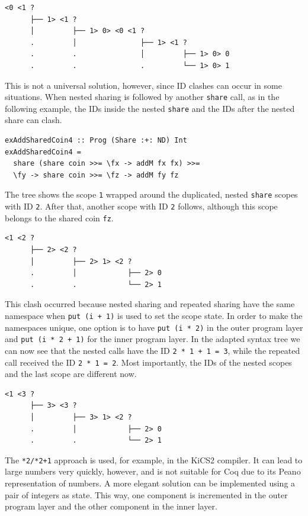 \documentclass[a4paper, 11pt, fleqn, twoside]{scrreprt}
\newcommand{\hinl}[1]{\texttt{#1}}
\begin{document}
\begin{verbatim}
<0 <1 ? 
      ├── 1> <1 ? 
      │         ├── 1> 0> <0 <1 ? 
      .         │               ├── 1> <1 ? 
      .         .               │         ├── 1> 0> 0
      .         .               .         └── 1> 0> 1
\end{verbatim}

This is not a universal solution, however, since ID clashes can occur in some situations.
When nested sharing is followed by another \hinl{share} call, as in the following example, the IDs inside the nested \hinl{share} and the IDs after the nested share can clash.

\begin{verbatim}
exAddSharedCoin4 :: Prog (Share :+: ND) Int
exAddSharedCoin4 =
  share (share coin >>= \fx -> addM fx fx) >>=
  \fy -> share coin >>= \fz -> addM fy fz
\end{verbatim}

The tree shows the scope \hinl{1} wrapped around the duplicated, nested \hinl{share} scopes with ID \hinl{2}.
After that, another scope with ID \hinl{2} follows, although this scope belongs to the shared coin \hinl{fz}.

\begin{verbatim}
<1 <2 ? 
      ├── 2> <2 ? 
      │         ├── 2> 1> <2 ?
      .         │            ├── 2> 0
      .         .            └── 2> 1
\end{verbatim}

This clash occurred because nested sharing and repeated sharing have the same namespace when \hinl{put (i + 1)} is used to set the scope state.
In order to make the namespaces unique, one option is to have \hinl{put (i * 2)} in the outer program layer and \hinl{put (i * 2 + 1)} for the inner program layer.
In the adapted syntax tree we can now see that the nested calls have the ID \hinl{2 * 1 + 1 = 3}, while the repeated call received the ID \hinl{2 * 1 = 2}.
Most importantly, the IDs of the nested scopes and the last scope are different now.

\begin{verbatim}
<1 <3 ? 
      ├── 3> <3 ? 
      │         ├── 3> 1> <2 ? 
      .         │            ├── 2> 0
      .         .            └── 2> 1

\end{verbatim}

The \hinl{*2/*2+1} approach is used, for example, in the KiCS2 compiler.
It can lead to large numbers very quickly, however, and is not suitable for Coq due to its Peano representation of numbers.
A more elegant solution can be implemented using a pair of integers as state.
This way, one component is incremented in the outer program layer and the other component in the inner layer.
\end{document}
